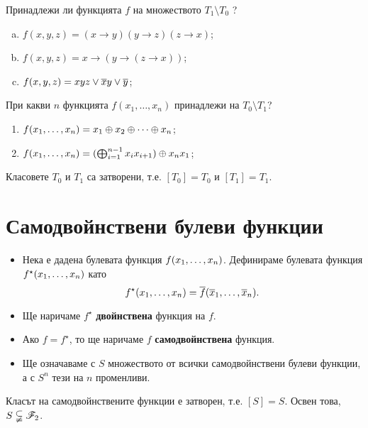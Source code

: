\begin{problem}
  Принадлежи ли функцията $f$ на множеството $T_1 \setminus T_0$ ?
  \begin{enumerate}[a)]
  \item
    $f(x,y,z) = (x\rightarrow y)(y\rightarrow z)(z\rightarrow x)$;
  \item
    $f(x,y,z) = x\rightarrow(y\rightarrow (z\rightarrow x))$;
  \item
    $f(x,y,z) = xyz \vee \overline{x}y \vee \overline{y}$;
  \end{enumerate}
\end{problem}

\begin{problem}
  При какви $n$ функцията $f(x_1,\dots, x_n)$ принадлежи на $T_0\setminus T_1$?
  \begin{enumerate}[1)]
  \item
    $f(x_{1},\dots,x_{n}) = x_1\oplus x_2 \oplus\dots\oplus x_n$;
  \item
    $f(x_{1},\dots,x_{n}) = (\bigoplus^{n-1}_{i=1} x_ix_{i+1})\oplus x_nx_1$;
  \end{enumerate}
\end{problem}

\begin{prop}
  Класовете $T_0$ и $T_1$ са затворени, т.е. $[T_0] = T_0$ и $[T_1] = T_1$.
\end{prop}


\section{Самодвойнствени булеви функции}
\begin{itemize}
\item 
  Нека е дадена булевата функция $f(x_{1},\dots,x_{n})$. Дефинираме булевата функция $f^\star(x_{1},\dots,x_{n})$ като
  \[f^\star(x_{1},\dots,x_{n}) = \overline{f}(\overline{x}_1,\dots,\overline{x}_n).\]
\item
  Ще наричаме $f^\star$ {\bf двойнствена} функция на $f$.
\item
  Ако $f = f^\star$, то ще наричаме $f$ {\bf самодвойнствена} функция.
\item
  Ще означаваме с $S$ множеството от всички самодвойнствени булеви функции, а с $S^n$ тези на $n$ променливи.
\end{itemize}

\begin{prop}
  Класът на самодвойнствените функции е затворен, т.е. $[S] = S$.
  Освен това, $S \subsetneqq \mathscr{F}_2$.
\end{prop}

